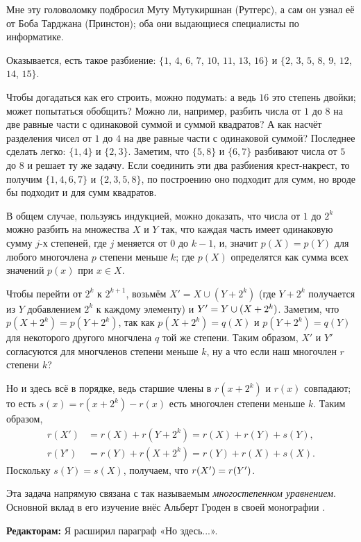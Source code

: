 Мне эту головоломку подбросил Муту Мутукиршнан (Рутгерс),
а сам он узнал её от Боба Тарджана (Принстон);
оба они выдающиеся специалисты по информатике.

Оказывается, есть такое разбиение: $\{1$, $4$, $6$, $7$, $10$, $11$, $13$, $16\}$ и $\{2$, $3$, $5$, $8$, $9$, $12$, $14$, $15\}$.

Чтобы догадаться как его строить, можно подумать:
а ведь $16$ это степень двойки;
может попытаться обобщить?
Можно ли, например, разбить числа от $1$ до $8$ на две равные части с одинаковой суммой и суммой квадратов?
А как насчёт разделения чисел от $1$ до $4$ на две равные части с одинаковой суммой?
Последнее сделать легко: $\{1, 4\}$ и $\{2, 3\}$.
Заметим, что $\{5, 8\}$ и $\{6, 7\}$ разбивают числа от $5$ до $8$ и решает ту же задачу.
Если соединить эти два разбиения крест-накрест, то получим $\{1, 4, 6, 7\}$ и $\{2, 3, 5, 8\}$, по построению оно подходит для сумм, но вроде бы подходит и для сумм квадратов.

В общем случае, пользуясь индукцией, можно доказать, что числа от $1$ до $2^k$ можно разбить на множества $X$ и $Y$ так, что каждая часть имеет одинаковую сумму $j$-х степеней, где $j$ меняется от $0$ до $k - 1$, и, значит $p(X)=p(Y)$ для любого многочлена $p$ степени меньше $k$;
где $p(X)$ определятся как сумма всех значений $p(x)$ при $x \in X$.

Чтобы перейти от $2^{k}$ к $2^{k+1}$, возьмём $X' = X \cup (Y + 2^k)$
(где $Y + 2^k$ получается из $Y$ добавлением $2^k$ к каждому элементу) и $Y' \z= Y \cup (X + 2^k)$.
Заметим, что $p(X + 2^k) = p(Y + 2^k)$,
так как $p(X + 2^k)=q(X)$ и $p(Y + 2^k)=q(Y)$ для некоторого другого многчлена $q$ той же степени.
Таким образом, $X'$ и $Y'$ согласуются для многчленов степени меньше $k$, ну а что если наш многочлен $r$ степени $k$?

Но и здесь всё в порядке, ведь старшие члены в $r(x+2^k)$ и $r(x)$ совпадают;
то есть $s(x)=r(x+2^k)-r(x)$ есть многочлен степени меньше $k$.
Таким образом,
\begin{align*}
r(X')&=r(X)+r(Y+2^k)=r(X)+r(Y)+s(Y),
\\
r(Y')&=r(Y)+r(X+2^k)=r(Y)+r(X)+s(X).
\end{align*}
Поскольку $s(Y)=s(X)$, получаем, что $r(X')\z=r(Y')$.

Эта задача напрямую связана с так называемым \emph{многостепенном уравнением}.
Основной вклад в его изучение внёс Альберт Гроден в своей монографии \cite{gloden}.


\begin{addedbytheeditors}
\textbf{Редакторам:} Я расширил параграф «Но здесь...».
\end{addedbytheeditors}

